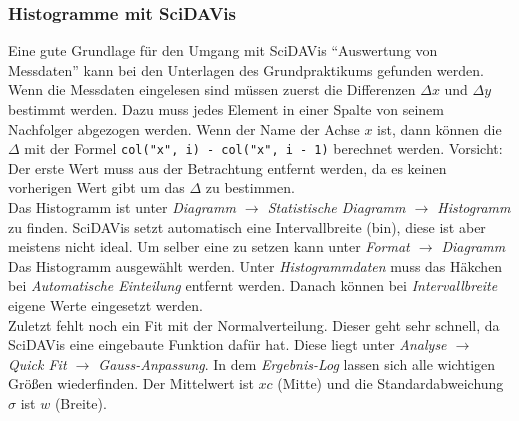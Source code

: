 \subsubsection*{Histogramme mit SciDAVis}
Eine gute Grundlage für den Umgang mit SciDAVis ``Auswertung von Messdaten'' kann bei den Unterlagen des Grundpraktikums gefunden werden.\\
Wenn die Messdaten eingelesen sind müssen zuerst die Differenzen $\Delta x$ und $\Delta y$ bestimmt werden. Dazu muss jedes Element in einer Spalte von seinem Nachfolger abgezogen werden. Wenn der Name der Achse $x$ ist, dann können die $\Delta$ mit der Formel \verb|col("x", i) - col("x", i - 1)| berechnet werden. Vorsicht: Der erste Wert muss aus der Betrachtung entfernt werden, da es keinen vorherigen Wert gibt um das $\Delta$ zu bestimmen.\\
Das Histogramm ist unter \emph{Diagramm $\rightarrow$ Statistische Diagramm $\rightarrow$ Histogramm} zu finden. SciDAVis setzt automatisch eine Intervallbreite (bin), diese ist aber meistens nicht ideal. Um selber eine zu setzen kann unter \emph{Format $\rightarrow$ Diagramm} Das Histogramm ausgewählt werden. Unter \emph{Histogrammdaten} muss das Häkchen bei \emph{Automatische Einteilung} entfernt werden. Danach können bei \emph{Intervallbreite} eigene Werte eingesetzt werden.\\
Zuletzt fehlt noch ein Fit mit der Normalverteilung. Dieser geht sehr schnell, da SciDAVis eine eingebaute Funktion dafür hat. Diese liegt unter \emph{Analyse $\rightarrow$ Quick Fit $\rightarrow$ Gauss-Anpassung}. In dem \emph{Ergebnis-Log} lassen sich alle wichtigen Größen wiederfinden. Der Mittelwert ist $xc$ (Mitte) und die Standardabweichung $\sigma$ ist $w$ (Breite).
